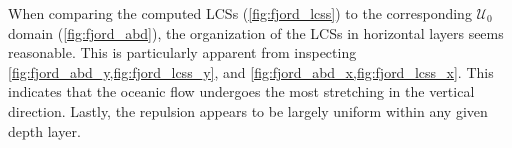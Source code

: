 



When comparing the computed LCSs (\cref{fig:fjord_lcss}) to the corresponding
$\mathcal{U}_{0}$ domain (\cref{fig:fjord_abd}), the organization of
the LCSs in horizontal layers seems reasonable. This is particularly apparent
from inspecting \cref{fig:fjord_abd_y,fig:fjord_lcss_y}, and
\cref{fig:fjord_abd_x,fig:fjord_lcss_x}. This indicates that the oceanic
flow undergoes the most stretching in the vertical direction. Lastly, the
repulsion appears to be largely uniform within any given depth layer.



